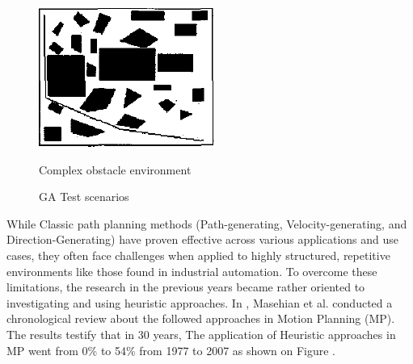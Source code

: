 \begin{figure}[h!]
\begin{minipage}{0.30\textwidth}
        \label{Intermediate obstacle environment}
    \end{minipage}
    \begin{minipage}{0.30\textwidth}
        \centering
        \includegraphics[width=\linewidth]{images/Chap1/R17_complex.png} %
        \caption{Complex obstacle environment}
        \label{Complex obstacle environment}
    \end{minipage}
    \caption{GA Test scenarios \cite{R17}}
    \label{R17 test scenarios}
\end{figure}

While Classic path planning methods (Path-generating, Velocity-generating, and Direction-Generating) 
have proven effective across various applications and use cases, 
they often face challenges when applied to highly structured, repetitive environments like those found 
in industrial automation. To overcome these limitations, the research in the previous years became rather 
oriented to investigating and using heuristic approaches. In \cite{R26}, Masehian et al. conducted a 
chronological review about the followed approaches in Motion Planning (MP). The results testify that in 30 years,
The application of Heuristic approaches in MP went from 0\% to 54\% from 1977 to 2007 as shown on Figure 
.

